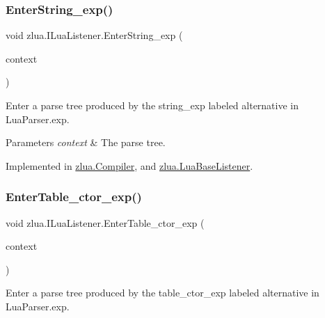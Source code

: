 \subsubsection{\texorpdfstring{Enter\+String\+\_\+exp()}{EnterString\_exp()}}
{\footnotesize\ttfamily void zlua.\+I\+Lua\+Listener.\+Enter\+String\+\_\+exp (\begin{DoxyParamCaption}\item[{\mbox{[}\+Not\+Null\mbox{]} \mbox{\hyperlink{classzlua_1_1_lua_parser_1_1_string__exp_context}{Lua\+Parser.\+String\+\_\+exp\+Context}}}]{context }\end{DoxyParamCaption})}



Enter a parse tree produced by the {\ttfamily string\+\_\+exp} labeled alternative in Lua\+Parser.\+exp. 


\begin{DoxyParams}{Parameters}
{\em context} & The parse tree.\\
\hline
\end{DoxyParams}


Implemented in \mbox{\hyperlink{classzlua_1_1_compiler_aed4778e096225183ba6add21e832faaf}{zlua.\+Compiler}}, and \mbox{\hyperlink{classzlua_1_1_lua_base_listener_aba9f9054eb0fce5f9e2108c03098b28a}{zlua.\+Lua\+Base\+Listener}}.

\mbox{\label{interfacezlua_1_1_i_lua_listener_a8f36bb02f3d3923600ba29606adf1db4}} 
\subsubsection{\texorpdfstring{Enter\+Table\+\_\+ctor\+\_\+exp()}{EnterTable\_ctor\_exp()}}
{\footnotesize\ttfamily void zlua.\+I\+Lua\+Listener.\+Enter\+Table\+\_\+ctor\+\_\+exp (\begin{DoxyParamCaption}\item[{\mbox{[}\+Not\+Null\mbox{]} \mbox{\hyperlink{classzlua_1_1_lua_parser_1_1_table__ctor__exp_context}{Lua\+Parser.\+Table\+\_\+ctor\+\_\+exp\+Context}}}]{context }\end{DoxyParamCaption})}



Enter a parse tree produced by the {\ttfamily table\+\_\+ctor\+\_\+exp} labeled alternative in Lua\+Parser.\+exp. 


